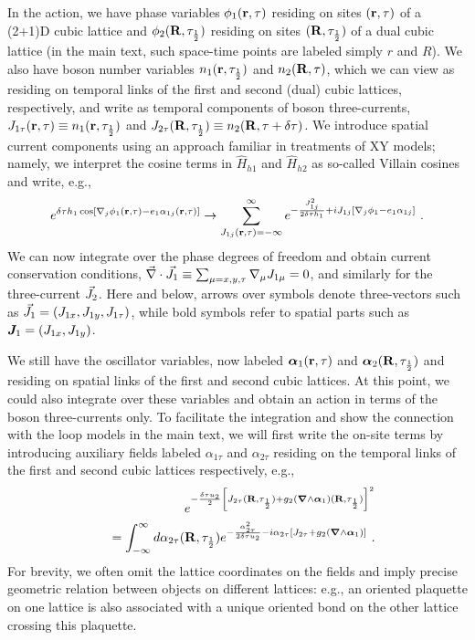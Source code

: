 In the action, we have phase variables $\phi_1({\bf r}, \tau)$ residing on sites $({\bf r}, \tau)$ of a (2+1)D cubic lattice and $\phi_2({\bf R}, \tau_{\frac{1}{2}})$ residing on sites $({\bf R}, \tau_{\frac{1}{2}})$ of a dual cubic lattice (in the main text, such space-time points are labeled simply $r$ and $R$).  We also have boson number variables $n_1({\bf r}, \tau_{\frac{1}{2}})$ and $n_2({\bf R}, \tau)$, which we can view as residing on temporal links of the first and second (dual) cubic lattices, respectively, and write as temporal components of boson three-currents, $J_{1\tau}({\bf r}, \tau) \equiv n_1({\bf r}, \tau_{\frac{1}{2}})$ and $J_{2\tau}({\bf R}, \tau_{\frac{1}{2}}) \equiv n_2({\bf R}, \tau + \delta\tau)$.  We introduce spatial current components using an approach familiar in treatments of XY models; namely, we interpret the cosine terms in $\hat{H}_{h1}$ and $\hat{H}_{h2}$ as so-called Villain cosines and write, e.g.,
\begin{eqnarray*}
 e^{\delta\tau h_1 \cos[\nabla_j \phi_1({\bf r}, \tau) - e_1 \alpha_{1j}({\bf r}, \tau)]} 
 \to \sum_{J_{1j}({\bf r}, \tau) = -\infty}^\infty e^{-\frac{J_{1j}^2}{2 \delta\tau h_1} + i J_{1j} [\nabla_j \phi_1 - e_1 \alpha_{1j}]} ~.
\end{eqnarray*}
We can now integrate over the phase degrees of freedom and obtain current conservation conditions, $\vec{\nabla} \cdot {\vec{J}}_1 \equiv \sum_{\mu=x, y, \tau} \nabla_\mu J_{1\mu} = 0$, and similarly for the three-current ${\vec{J}}_2$.
Here and below, arrows over symbols denote three-vectors such as ${\vec{J}}_1 = (J_{1x}, J_{1y}, J_{1\tau})$, while bold symbols refer to spatial parts such as ${\bm {J}}_1 = (J_{1x}, J_{1y})$.

We still have the oscillator variables, now labeled ${\bm \alpha}_1({\bf r}, \tau)$ and ${\bm \alpha}_2({\bf R}, \tau_{\frac{1}{2}})$ and residing on spatial links of the first and second cubic lattices.  At this point, we could also integrate over these variables and obtain an action in terms of the boson three-currents only.  To facilitate the integration and show the connection with the loop models in the main text, we will first write the on-site terms by introducing auxiliary fields labeled $\alpha_{1\tau}$ and $\alpha_{2\tau}$ residing on the temporal links of the first and second cubic lattices respectively, e.g.,
\begin{eqnarray*}
&& e^{-\frac{\delta\tau u_2}{2} \left[J_{2\tau}({\bf R}, \tau_{\frac{1}{2}}) + g_2 ({\bm \nabla} \wedge {\bm \alpha}_1)({\bf R}, \tau_{\frac{1}{2}}) \right]^2} \\
&& = \int_{-\infty}^\infty d\alpha_{2\tau}({\bf R}, \tau_{\frac{1}{2}}) e^{-\frac{\alpha_{2\tau}^2}{2 \delta\tau u_2} - i \alpha_{2\tau} \left[J_{2\tau} + g_2 ({\bm \nabla} \wedge {\bm \alpha}_1) \right]}~.
\end{eqnarray*}
For brevity, we often omit the lattice coordinates on the fields and imply precise geometric relation between objects on different lattices: e.g., an oriented plaquette on one lattice is also associated with a unique oriented bond on the other lattice crossing this plaquette.

